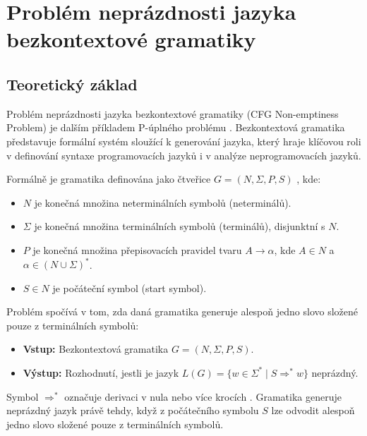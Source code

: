 \chapter{Problém neprázdnosti jazyka \\ bezkontextové gramatiky}
\label{sec:Grammars}

\section{Teoretický základ}
\label{sec:GrammarsTheory}

Problém neprázdnosti jazyka bezkontextové gramatiky (CFG Non-emptiness Problem) je dalším příkladem P-úplného problému \cite{sawa}. Bezkontextová gramatika představuje formální systém sloužící k generování jazyka, který hraje klíčovou roli v definování syntaxe programovacích jazyků i v analýze neprogramovacích jazyků.

Formálně je gramatika definována jako čtveřice \( G = (N, \Sigma, P, S) \) \cite{uti_grammars}, kde:

\begin{itemize}
    \item \( N \) je konečná množina neterminálních symbolů (neterminálů).
    \item \( \Sigma \) je konečná množina terminálních symbolů (terminálů), disjunktní s \( N \).
    \item \( P \) je konečná množina přepisovacích pravidel tvaru \( A \to \alpha \), kde \( A \in N \) a \( \alpha \in (N \cup \Sigma)^* \).
    \item \( S \in N \) je počáteční symbol (start symbol).
\end{itemize}

Problém spočívá v tom, zda daná gramatika generuje alespoň jedno slovo složené pouze z terminálních symbolů:

\begin{itemize}
    \item \textbf{Vstup:} Bezkontextová gramatika \( G = (N, \Sigma, P, S) \).
    \item \textbf{Výstup:} Rozhodnutí, jestli je jazyk \( L(G) = \{ w \in \Sigma^* \mid S \Rightarrow^* w \} \) neprázdný.
\end{itemize}

Symbol \( \Rightarrow^* \) označuje derivaci v nula nebo více krocích \cite{uti_grammars}. Gramatika generuje neprázdný jazyk právě tehdy, když z počátečního symbolu \( S \) lze odvodit alespoň jedno slovo složené pouze z terminálních symbolů.

